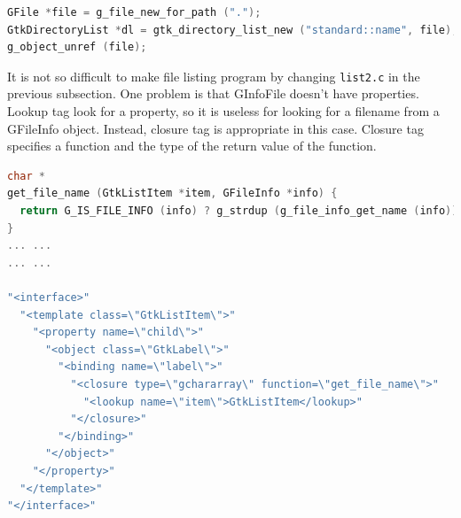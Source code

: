 \begin{lstlisting}[language=C]
GFile *file = g_file_new_for_path (".");
GtkDirectoryList *dl = gtk_directory_list_new ("standard::name", file);
g_object_unref (file);
\end{lstlisting}

It is not so difficult to make file listing program by changing
\passthrough{\lstinline!list2.c!} in the previous subsection. One
problem is that GInfoFile doesn't have properties. Lookup tag look for a
property, so it is useless for looking for a filename from a GFileInfo
object. Instead, closure tag is appropriate in this case. Closure tag
specifies a function and the type of the return value of the function.

\begin{lstlisting}[language=C]
char *
get_file_name (GtkListItem *item, GFileInfo *info) {
  return G_IS_FILE_INFO (info) ? g_strdup (g_file_info_get_name (info)) : NULL;
}
... ...
... ...

"<interface>"
  "<template class=\"GtkListItem\">"
    "<property name=\"child\">"
      "<object class=\"GtkLabel\">"
        "<binding name=\"label\">"
          "<closure type=\"gchararray\" function=\"get_file_name\">"
            "<lookup name=\"item\">GtkListItem</lookup>"
          "</closure>"
        "</binding>"
      "</object>"
    "</property>"
  "</template>"
"</interface>"
\end{lstlisting}

